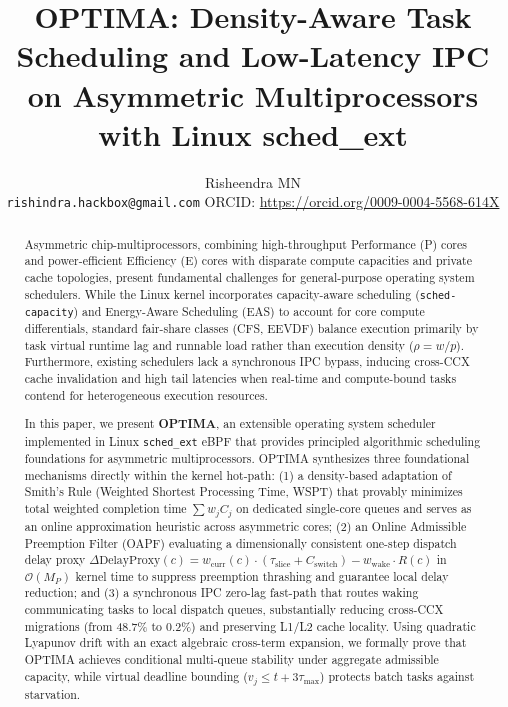 \documentclass[letterpaper,twocolumn,10pt]{article}
\title{OPTIMA: Density-Aware Task Scheduling and Low-Latency IPC on Asymmetric Multiprocessors with Linux sched\_ext}
\author{
{\rm Risheendra MN}\\
\texttt{rishindra.hackbox@gmail.com} \quad \textbar \quad ORCID: \url{https://orcid.org/0009-0004-5568-614X}
}
\begin{document}
\maketitle

\begin{abstract}
\normalfont
Asymmetric chip-multiprocessors, combining high-throughput Performance (P) cores and power-efficient Efficiency (E) cores with disparate compute capacities and private cache topologies, present fundamental challenges for general-purpose operating system schedulers. While the Linux kernel incorporates capacity-aware scheduling (\texttt{sched-capacity}) and Energy-Aware Scheduling (EAS) to account for core compute differentials, standard fair-share classes (CFS, EEVDF) balance execution primarily by task virtual runtime lag and runnable load rather than execution density ($\rho = w / p$). Furthermore, existing schedulers lack a synchronous IPC bypass, inducing cross-CCX cache invalidation and high tail latencies when real-time and compute-bound tasks contend for heterogeneous execution resources.

In this paper, we present \textbf{OPTIMA}, an extensible operating system scheduler implemented in Linux \texttt{sched\_ext} eBPF that provides principled algorithmic scheduling foundations for asymmetric multiprocessors. OPTIMA synthesizes three foundational mechanisms directly within the kernel hot-path: (1) a density-based adaptation of Smith's Rule (Weighted Shortest Processing Time, WSPT) that provably minimizes total weighted completion time $\sum w_j C_j$ on dedicated single-core queues and serves as an online approximation heuristic across asymmetric cores; (2) an Online Admissible Preemption Filter (OAPF) evaluating a dimensionally consistent one-step dispatch delay proxy $\Delta\mathrm{DelayProxy}(c) = w_{\mathrm{curr}}(c) \cdot (\tau_{\mathrm{slice}} + C_{\mathrm{switch}}) - w_{\mathrm{wake}} \cdot R(c)$ in $\mathcal{O}(M_P)$ kernel time to suppress preemption thrashing and guarantee local delay reduction; and (3) a synchronous IPC zero-lag fast-path that routes waking communicating tasks to local dispatch queues, substantially reducing cross-CCX migrations (from 48.7\% to 0.2\%) and preserving L1/L2 cache locality. Using quadratic Lyapunov drift with an exact algebraic cross-term expansion, we formally prove that OPTIMA achieves conditional multi-queue stability under aggregate admissible capacity, while virtual deadline bounding ($v_j \le t + 3\tau_{\max}$) protects batch tasks against starvation.


\end{abstract}
\end{document}

